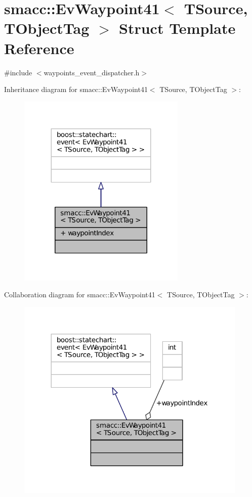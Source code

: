 \hypertarget{structsmacc_1_1EvWaypoint41}{}\section{smacc\+:\+:Ev\+Waypoint41$<$ T\+Source, T\+Object\+Tag $>$ Struct Template Reference}
\label{structsmacc_1_1EvWaypoint41}


{\ttfamily \#include $<$waypoints\+\_\+event\+\_\+dispatcher.\+h$>$}



Inheritance diagram for smacc\+:\+:Ev\+Waypoint41$<$ T\+Source, T\+Object\+Tag $>$\+:
\nopagebreak
\begin{figure}[H]
\begin{center}
\leavevmode
\includegraphics[width=227pt]{structsmacc_1_1EvWaypoint41__inherit__graph}
\end{center}
\end{figure}


Collaboration diagram for smacc\+:\+:Ev\+Waypoint41$<$ T\+Source, T\+Object\+Tag $>$\+:
\nopagebreak
\begin{figure}[H]
\begin{center}
\leavevmode
\includegraphics[width=312pt]{structsmacc_1_1EvWaypoint41__coll__graph}
\end{center}
\end{figure}

